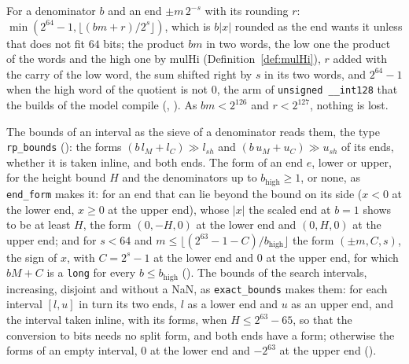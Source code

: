 \begin{definition}\label{def:exactScale}
  \leanok
  For a denominator $b$ and an end $\pm m\,2^{-s}$ with its rounding $r$:
  $\min(2^{64} - 1, \lfloor (b m + r)/2^s \rfloor)$, which is $b|x|$ rounded as the end wants it
  unless that does not fit $64$ bits; the product $b m$ in two words, the low one the product of the
  words and the high one by $\mathrm{mulHi}$ (Definition~\ref{def:mulHi}), $r$ added with the carry
  of the low word, the sum shifted right by $s$ in its two words, and $2^{64} - 1$ when the high
  word of the quotient is not $0$, the arm of \verb|unsigned __int128| that the builds of the model
  compile (, ). As
  $b m < 2^{126}$ and $r < 2^{127}$, nothing is lost.
\end{definition}

\begin{definition}\label{def:exactBounds}
  \leanok
  The bounds of an interval as the sieve of a denominator reads them, the type \verb|rp_bounds|
  (): the forms $(b\,l_M + l_C) \gg l_{\mathit{sh}}$ and
  $(b\,u_M + u_C) \gg u_{\mathit{sh}}$ of its ends, whether it is taken inline, and both ends. The
  form of an end $e$, lower or upper, for the height bound $H$ and the denominators up to
  $b_{\mathrm{high}} \ge 1$, or none, as \verb|end_form| makes it: for an end that can lie beyond
  the bound on its side ($x < 0$ at the lower end, $x \ge 0$ at the upper end), whose $|x|$ the
  scaled end at $b = 1$ shows to be at least $H$, the form $(0, -H, 0)$ at the lower end and
  $(0, H, 0)$ at the upper end; and for $s < 64$ and
  $m \le \lfloor (2^{63} - 1 - C)/b_{\mathrm{high}} \rfloor$ the form $(\pm m, C, s)$, the sign of
  $x$, with $C = 2^s - 1$ at the lower end and $0$ at the upper end, for which $b M + C$ is a
  \verb|long| for every $b \le b_{\mathrm{high}}$ (). The bounds
  of the search intervals, increasing, disjoint and without a NaN, as \verb|exact_bounds| makes
  them: for each interval $[l, u]$ in turn its two ends, $l$ as a lower end and $u$ as an upper end,
  and the interval taken inline, with its forms, when $H \le 2^{63} - 65$, so that the conversion to
  bits needs no split form, and both ends have a form; otherwise the forms of an empty interval, $0$
  at the lower end and $-2^{63}$ at the upper end ().
\end{definition}

